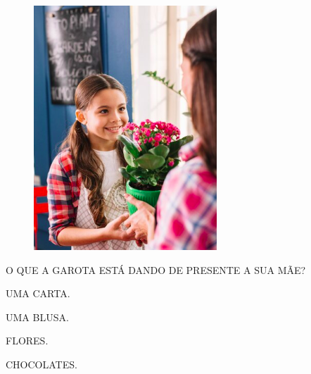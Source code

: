 \begin{minipage}{.3\textwidth}
\begin{figure}[H]
\includegraphics[width=\textwidth]{media/image175b.png}
\end{figure}
\end{minipage}
\hspace{.5cm}
\begin{minipage}{.6\textwidth}
O QUE A GAROTA ESTÁ DANDO DE PRESENTE A SUA MÃE?

\begin{escolha}
\item UMA CARTA.

\item UMA BLUSA.

\item FLORES.

\item CHOCOLATES.
\end{escolha}
\end{minipage}

